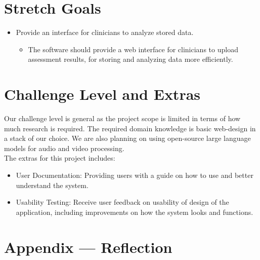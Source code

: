 \documentclass{article}
\begin{document}
\section{Stretch Goals}
\begin{itemize}
    \item Provide an interface for clinicians to analyze stored data.
    \begin{itemize}
        \item The software should provide a web interface for clinicians to upload assessment results, for storing and analyzing data more efficiently.
    \end{itemize}
\end{itemize}


\section{Challenge Level and Extras}

Our challenge level is general as the project scope is limited in terms of how much research is required. The required domain knowledge
is basic web-design in a stack of our choice. We are also planning on using open-source large language models for audio and video processing.\\
\indent The extras for this project includes:
\begin{itemize}
    \item User Documentation: Providing users with a guide on how to use and better understand the system.
    \item Usability Testing: Receive user feedback on usability of design of the application, including improvements on how the system looks and functions.
\end{itemize}

\newpage{}

\section*{Appendix --- Reflection}


\end{document}
